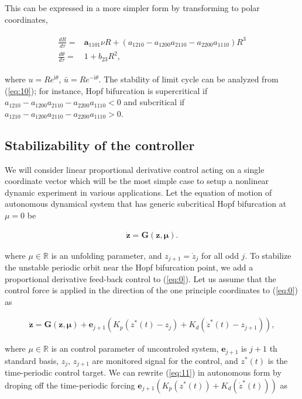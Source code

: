 \documentclass[openacc]{rsproca_new}%
\def\real{\mathbb{R}}
\def\vec#1{\ensuremath{\mathbf{#1}}}
\newcommand{\Eref}[1]{(\ref{#1})}
\begin{document}
\noindent This can be expressed in a more simpler form by transforming to polar coordinates,

\begin{align}\label{eq:10}
\begin{split}
\frac{dR}{d\tau}=&\vec{a}_{1101}\nu R+(a_{1210}-a_{1200}a_{2110}-a_{2200}a_{1110})R^3\\
\frac{d\theta}{d\tau}=&1+b_{23}R^2,
\end{split}
\end{align}

\noindent where $u=Re^{\textrm{i} \theta}$, $\bar u=Re^{-\textrm{i} \theta}$. The stability of limit cycle can be analyzed from \Eref{eq:10}; for instance, Hopf bifurcation is supercritical if \(a_{1210}-a_{1200}a_{2110}-a_{2200}a_{1110}<0\) and subcritical if \(a_{1210}-a_{1200}a_{2110}-a_{2200}a_{1110}>0\).


\subsection{Stabilizability of the controller}

We will consider linear proportional derivative control acting on a single coordinate vector which will be the most simple case to setup a nonlinear dynamic experiment in various applications. Let the equation of motion of autonomous dynamical system that has  generic subcritical Hopf bifurcation at $\mu=0$ be

\begin{align}\label{eq:0}
    \dot{\vec{z}} =\vec{G}(\vec{z},\vec{\mu}).
\end{align}

\noindent where $\mu\in \real$ is an unfolding parameter, and $z_{j+1}=\dot z_j$ for all odd $j$. To stabilize the unstable periodic orbit near the Hopf bifurcation point, we add a proportional derivative feed-back control to \Eref{eq:0}. Let us assume that the control force is applied in the direction of the one principle coordinates to \Eref{eq:0} as

\begin{align}\label{eq:11}
    \dot{\vec{z}} =\vec{G}(\vec{z},\vec{\mu})+\vec{e}_{j+1}(K_p(z^*(t)-z_j)+K_d(\dot z^*(t)-z_{j+1})),
\end{align}

\noindent where $\mu\in \real$ is an control parameter of uncontroled system, $\vec{e}_{j+1}$ is $j+1$ th standard basis, $z_{j}$, $z_{j+1}$ are monitored signal for the control, and $z^*(t)$  is the time-periodic control target. We can rewrite \Eref{eq:11} in autonomous form by droping off the time-periodic forcing $\vec{e}_{j+1}(K_p(z^*(t))+K_d(\dot z^*(t)))$ as
\end{document}

